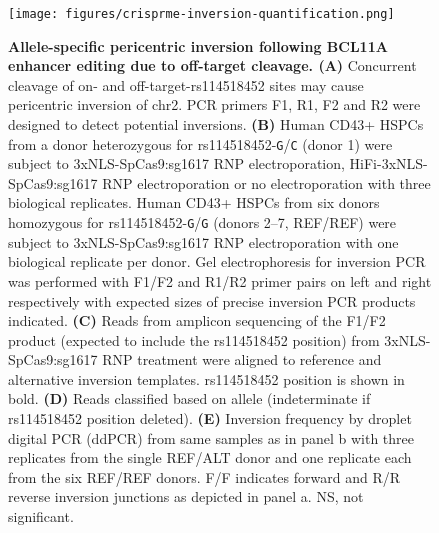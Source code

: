 \documentclass[a4paper, titlepage, openright]{book}
\begin{document}
\begin{figure}
	\centering
	\texttt{[image: figures/crisprme-inversion-quantification.png]}
	\caption[Allele-specific pericentric inversion following BCL11A enhancer editing due to off-target cleavage]{\textbf{Allele-specific pericentric inversion following BCL11A enhancer editing due to off-target cleavage. (A)} Concurrent cleavage of on- and off-target-rs114518452 sites may cause pericentric inversion of chr2. PCR primers F1, R1, F2 and R2 were designed to detect potential inversions. \textbf{(B)} Human CD43+ HSPCs from a donor heterozygous for rs114518452-\texttt{G}/\texttt{C} (donor 1) were subject to 3xNLS-SpCas9:sg1617 RNP electroporation, HiFi-3xNLS-SpCas9:sg1617 RNP electroporation or no electroporation with three biological replicates. Human CD43+ HSPCs from six donors homozygous for rs114518452-\texttt{G}/\texttt{G} (donors 2–7, REF/REF) were subject to 3xNLS-SpCas9:sg1617 RNP electroporation with one biological replicate per donor. Gel electrophoresis for inversion PCR was performed with F1/F2 and R1/R2 primer pairs on left and right respectively with expected sizes of precise inversion PCR products indicated. \textbf{(C)} Reads from amplicon sequencing of the F1/F2 product (expected to include the rs114518452 position) from 3xNLS-SpCas9:sg1617 RNP treatment were aligned to reference and alternative inversion templates. rs114518452 position is shown in bold. \textbf{(D)} Reads classified based on allele (indeterminate if rs114518452 position deleted). \textbf{(E)} Inversion frequency by droplet digital PCR (ddPCR) from same samples as in panel b with three replicates from the single REF/ALT donor and one replicate each from the six REF/REF donors. F/F indicates forward and R/R reverse inversion junctions as depicted in panel a. NS, not significant.}
	\label{fig:crisprme-inversion-quantification}
\end{figure}

\end{document}
